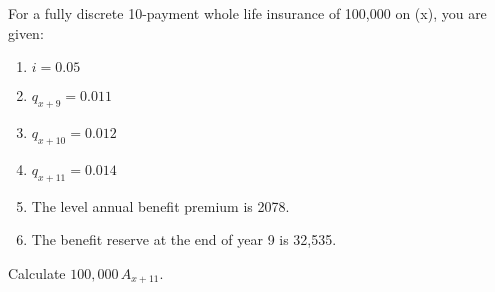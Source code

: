 For a fully discrete 10-payment whole life insurance of 100,000 on (x), you are given:
\begin{enumerate}
\item $i = 0.05$
\item $q_{x+9} = 0.011$
\item $q_{x+10} = 0.012$
\item $q_{x+11} = 0.014$
\item The level annual benefit premium is 2078.
\item The benefit reserve at the end of year 9 is 32,535.
\end{enumerate}
Calculate $100,000\,A_{x+11}.$
